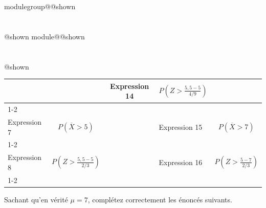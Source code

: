 \documentclass{Evaluation}
\makeatletter
\newcommand{\currentmodulekey}{}
\newcommand{\currentmoduletitle}{}
\newcommand{\currentgroupkey}{}
\newcommand{\currentgrouptitle}{}
\newcommand{\showmoduleifneeded}{%
  \ifx\currentgroupkey\empty\else
    \expandafter\ifx\csname modulegroup@\currentgroupkey @shown\endcsname\relax
      \section*{\currentgrouptitle}%
      \expandafter\gdef\csname modulegroup@\currentgroupkey @shown\endcsname{1}%
    \fi
  \fi
  \expandafter\ifx\csname module@\currentmodulekey @shown\endcsname\relax
    \section*{\currentmoduletitle}%
    \expandafter\gdef\csname module@\currentmodulekey @shown\endcsname{1}%
  \fi
}
\newenvironment{A22}{\showmoduleifneeded}{}
\makeatother
\begin{document}
\begin{questions}
\begin{A22}
\begin{tabular}{|l|c|c|l|c|}
	 &  &
	 Expression 14 & $\displaystyle P\left( Z > \frac{5,5-5}{4/9} \right)$
	 \\[4mm]
	 \cline{1-2}\cline{4-5}
	 &&&&\\[-3mm]
	 Expression 7 & $\displaystyle P\left( \overline{X} > 5 \right)$
	 &  &
	 Expression 15 & $\displaystyle P\left( \overline{X} > 7 \right)$
	 \\[4mm]
	 \cline{1-2}\cline{4-5}
	 &&&&\\[-3mm]
	 Expression 8 & $\displaystyle P\left( Z > \frac{5,5-5}{2/3} \right)$
	  &  &
	  Expression 16 & $\displaystyle P\left( Z > \frac{5-7}{2/3} \right)$
	  \\[4mm]
	  \cline{1-2}\cline{4-5}
\end{tabular}

\medskip\medskip\medskip\medskip

Sachant qu'en vérité $\mu = 7$, complétez correctement les énoncés suivants.

\medskip\medskip

\end{A22}
\end{questions}
\end{document}

